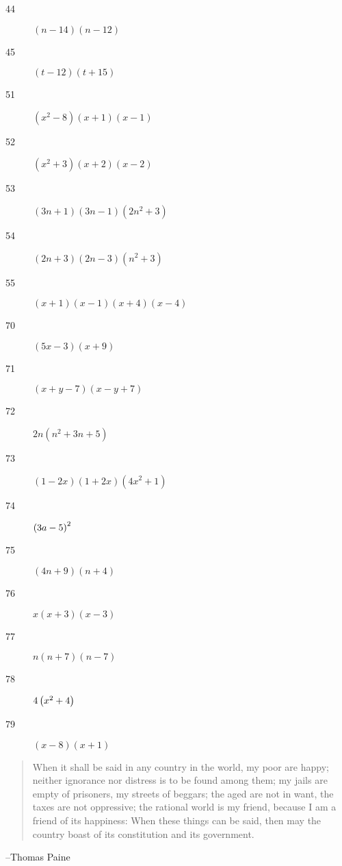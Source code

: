 \documentclass[letterpaper, landscape]{exam}
\begin{document}
\begin{description}
      \item[44] $(n - 14)(n - 12)$

      \item[45] $(t - 12)(t + 15)$

      \item[51] $(x^2 - 8)(x + 1)(x - 1)$

      \item[52] $(x^2 + 3)(x + 2)(x - 2)$

      \item[53] $(3n + 1)(3n - 1)(2n^2 + 3)$

      \item[54] $(2n + 3)(2n - 3)(n^2 + 3)$

      \item[55] $(x + 1)(x - 1)(x + 4)(x - 4)$

      \item[70] $(5x - 3)(x + 9)$

      \item[71] $(x + y - 7)(x - y + 7)$

      \item[72] $2n(n^2 + 3n + 5)$

      \item[73] $(1 - 2x)(1 + 2x)(4x^2 + 1)$

      \item[74] $\del{ 3a - 5 }^2$

      \item[75] $(4n + 9)(n + 4)$

      \item[76] $x(x + 3)(x - 3)$

      \item[77] $n(n + 7)(n - 7)$

      \item[78] $4 \del{x^2 + 4}$

      \item[79] $(x - 8)(x + 1)$

    \end{description}

  \fi
  \ifprintanswers{}
  \else
    \vspace{2 cm}
    \begin{quote}
      \begin{em}
        When it shall be said in any country in the world, my poor are happy;
        neither ignorance nor distress is to be found among them; my jails are
        empty of prisoners, my streets of beggars; the aged are not in want,
        the taxes are not oppressive; the rational world is my friend, because
        I am a friend of its happiness: When these things can be said, then may
        the country boast of its constitution and its government. 
      \end{em}
    \end{quote}
    \hspace{2 cm}--Thomas Paine
  \fi
\end{document}

